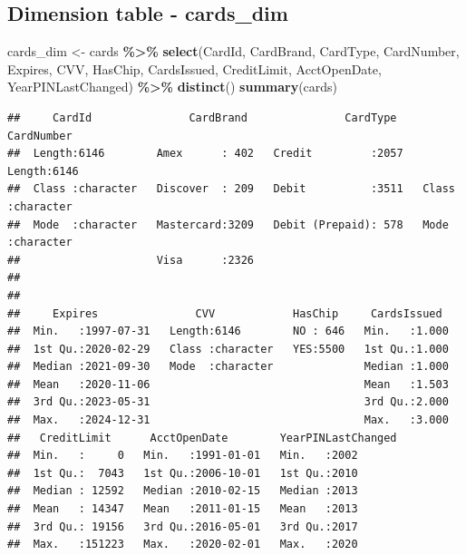 \documentclass[
]{article}
\newenvironment{Shaded}{\begin{snugshade}}{\end{snugshade}}
\newcommand{\FunctionTok}[1]{\textcolor[rgb]{0.13,0.29,0.53}{\textbf{#1}}}
\newcommand{\NormalTok}[1]{#1}
\newcommand{\OtherTok}[1]{\textcolor[rgb]{0.56,0.35,0.01}{#1}}
\newcommand{\SpecialCharTok}[1]{\textcolor[rgb]{0.81,0.36,0.00}{\textbf{#1}}}
\begin{document}
\subsection{Dimension table -
cards\_dim}\label{dimension-table---cards_dim}

\begin{Shaded}
\begin{Highlighting}[]
\NormalTok{cards\_dim }\OtherTok{\textless{}{-}}\NormalTok{ cards }\SpecialCharTok{\%\textgreater{}\%} \FunctionTok{select}\NormalTok{(CardId, CardBrand, CardType, CardNumber, Expires, }
\NormalTok{                              CVV, HasChip, CardsIssued, CreditLimit, }
\NormalTok{                              AcctOpenDate, YearPINLastChanged) }\SpecialCharTok{\%\textgreater{}\%} \FunctionTok{distinct}\NormalTok{()}
\FunctionTok{summary}\NormalTok{(cards)}
\end{Highlighting}
\end{Shaded}

\begin{verbatim}
##     CardId               CardBrand               CardType     CardNumber       
##  Length:6146        Amex      : 402   Credit         :2057   Length:6146       
##  Class :character   Discover  : 209   Debit          :3511   Class :character  
##  Mode  :character   Mastercard:3209   Debit (Prepaid): 578   Mode  :character  
##                     Visa      :2326                                            
##                                                                                
##                                                                                
##     Expires               CVV            HasChip     CardsIssued   
##  Min.   :1997-07-31   Length:6146        NO : 646   Min.   :1.000  
##  1st Qu.:2020-02-29   Class :character   YES:5500   1st Qu.:1.000  
##  Median :2021-09-30   Mode  :character              Median :1.000  
##  Mean   :2020-11-06                                 Mean   :1.503  
##  3rd Qu.:2023-05-31                                 3rd Qu.:2.000  
##  Max.   :2024-12-31                                 Max.   :3.000  
##   CreditLimit      AcctOpenDate        YearPINLastChanged
##  Min.   :     0   Min.   :1991-01-01   Min.   :2002      
##  1st Qu.:  7043   1st Qu.:2006-10-01   1st Qu.:2010      
##  Median : 12592   Median :2010-02-15   Median :2013      
##  Mean   : 14347   Mean   :2011-01-15   Mean   :2013      
##  3rd Qu.: 19156   3rd Qu.:2016-05-01   3rd Qu.:2017      
##  Max.   :151223   Max.   :2020-02-01   Max.   :2020
\end{verbatim}
\end{document}
